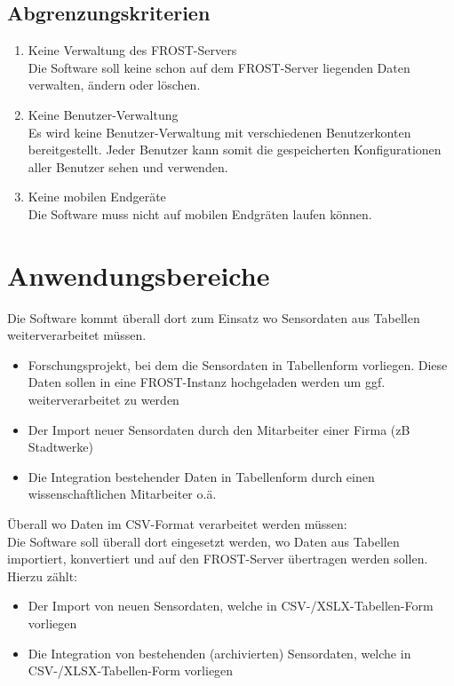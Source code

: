 \documentclass[a4paper, 12 pt]{article}
\begin{document}
	\subsection{Abgrenzungskriterien}
	\begin{enumerate}
	\item Keine Verwaltung des FROST-Servers \\
	Die Software soll keine schon auf dem FROST-Server liegenden Daten verwalten, ändern oder löschen.
	\item Keine Benutzer-Verwaltung \\
	Es wird keine Benutzer-Verwaltung mit verschiedenen Benutzerkonten bereitgestellt.
	Jeder Benutzer kann somit die gespeicherten Konfigurationen aller Benutzer sehen und verwenden.
	\item Keine mobilen Endgeräte \\
	Die Software muss nicht auf mobilen Endgräten laufen können.
	\end{enumerate}

\section{Anwendungsbereiche}
Die Software kommt überall dort zum Einsatz wo Sensordaten aus Tabellen weiterverarbeitet müssen. \\
\begin{itemize}
	\item Forschungsprojekt, bei dem die Sensordaten in Tabellenform vorliegen. Diese Daten sollen in eine FROST-Instanz hochgeladen werden um ggf. weiterverarbeitet zu werden
	\item Der Import neuer Sensordaten durch den Mitarbeiter einer Firma (zB Stadtwerke)
	\item Die Integration bestehender Daten in Tabellenform durch einen wissenschaftlichen Mitarbeiter o.ä.
\end{itemize}



Überall wo Daten im CSV-Format verarbeitet werden müssen: \\
Die Software soll überall dort eingesetzt werden, wo Daten aus Tabellen importiert, konvertiert und auf den FROST-Server übertragen werden sollen. \\
Hierzu zählt:
\begin{itemize}
	\item Der Import von neuen Sensordaten, welche in CSV-/XSLX-Tabellen-Form vorliegen
	\item Die Integration von bestehenden (archivierten) Sensordaten, welche in CSV-/XLSX-Tabellen-Form vorliegen
\end{itemize}
\end{document}
